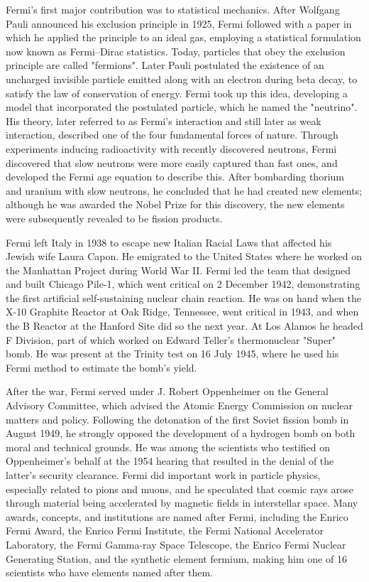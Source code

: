 Fermi's first major contribution was to statistical mechanics. After Wolfgang Pauli announced his exclusion principle in 1925, Fermi followed with a paper in which he applied the principle to an ideal gas, employing a statistical formulation now known as Fermi–Dirac statistics. Today, particles that obey the exclusion principle are called "fermions". Later Pauli postulated the existence of an uncharged invisible particle emitted along with an electron during beta decay, to satisfy the law of conservation of energy. Fermi took up this idea, developing a model that incorporated the postulated particle, which he named the "neutrino". His theory, later referred to as Fermi's interaction and still later as weak interaction, described one of the four fundamental forces of nature. Through experiments inducing radioactivity with recently discovered neutrons, Fermi discovered that slow neutrons were more easily captured than fast ones, and developed the Fermi age equation to describe this. After bombarding thorium and uranium with slow neutrons, he concluded that he had created new elements; although he was awarded the Nobel Prize for this discovery, the new elements were subsequently revealed to be fission products.

Fermi left Italy in 1938 to escape new Italian Racial Laws that affected his Jewish wife Laura Capon. He emigrated to the United States where he worked on the Manhattan Project during World War II. Fermi led the team that designed and built Chicago Pile-1, which went critical on 2 December 1942, demonstrating the first artificial self-sustaining nuclear chain reaction. He was on hand when the X-10 Graphite Reactor at Oak Ridge, Tennessee, went critical in 1943, and when the B Reactor at the Hanford Site did so the next year. At Los Alamos he headed F Division, part of which worked on Edward Teller's thermonuclear "Super" bomb. He was present at the Trinity test on 16 July 1945, where he used his Fermi method to estimate the bomb's yield.

After the war, Fermi served under J. Robert Oppenheimer on the General Advisory Committee, which advised the Atomic Energy Commission on nuclear matters and policy. Following the detonation of the first Soviet fission bomb in August 1949, he strongly opposed the development of a hydrogen bomb on both moral and technical grounds. He was among the scientists who testified on Oppenheimer's behalf at the 1954 hearing that resulted in the denial of the latter's security clearance. Fermi did important work in particle physics, especially related to pions and muons, and he speculated that cosmic rays arose through material being accelerated by magnetic fields in interstellar space. Many awards, concepts, and institutions are named after Fermi, including the Enrico Fermi Award, the Enrico Fermi Institute, the Fermi National Accelerator Laboratory, the Fermi Gamma-ray Space Telescope, the Enrico Fermi Nuclear Generating Station, and the synthetic element fermium, making him one of 16 scientists who have elements named after them.
